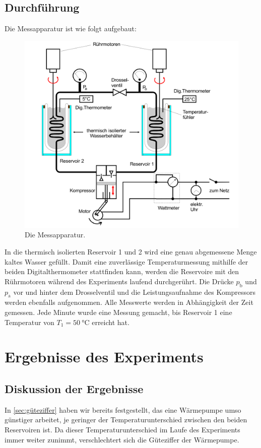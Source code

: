 \documentclass{scrartcl} %
\begin{document}
    \subsection{Durchführung}
      Die Messapparatur ist wie folgt aufgebaut:
      \begin{figure}
        \centering
        \includegraphics[scale = 0.15]{AufbauMessreihe.png}
        \caption{Die Messapparatur.}
        \label{fig:wärmepumpe2}
      \end{figure}
      In die thermisch isolierten Reservoir 1 und 2 wird eine genau abgemessene Menge kaltes Wasser gefüllt. Damit eine zuverlässige Temperaturmessung mithilfe der beiden
      Digitalthermometer stattfinden kann, werden die Reservoire mit den Rührmotoren während des Experiments laufend durchgerührt. Die Drücke $p_\text{b}$ und $p_\text{a}$
      vor und hinter dem Drosselventil und die Leistungsaufnahme des Kompressors werden ebenfalls aufgenommen. Alle Messwerte werden in Abhängigkeit der Zeit gemessen.
      Jede Minute wurde eine Messung gemacht, bis Reservoir 1 eine Temperatur von $T_\text{1} = \SI{50}{\celsius}$ erreicht hat.
\section{Ergebnisse des Experiments}
    \subsection{Diskussion der Ergebnisse}
      In \ref{sec:güteziffer} haben wir bereits festgestellt, das eine Wärmepumpe umso günstiger arbeitet, je geringer der Temperaturunterschied zwischen den beiden Reservoiren ist.
      Da dieser Temperaturunterschied im Laufe des Experiments immer weiter zunimmt, verschlechtert sich die Güteziffer der Wärmepumpe.
\end{document}
